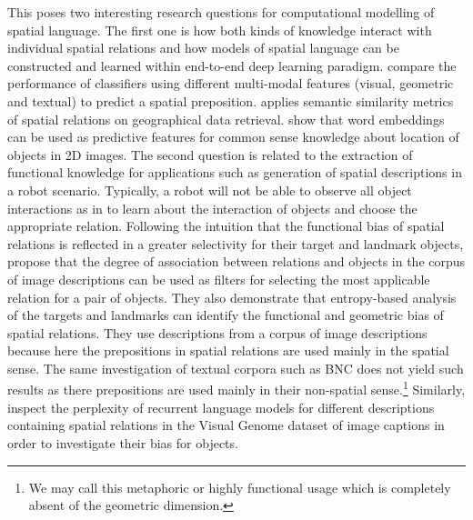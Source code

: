 This poses two interesting research questions for computational modelling of
spatial language. The first one is %
how both kinds of
knowledge interact with individual spatial relations and how models of spatial
language can be constructed and learned within end-to-end deep learning
paradigm. \citet{ramisa2015combining} compare the performance of classifiers
using different multi-modal features (visual, geometric and textual) to predict
a spatial preposition.  \citet{Schwering:2007aa} applies semantic similarity
metrics of spatial relations on geographical data retrieval.
\citet{collell2018acquiring} show that word embeddings can be used as
predictive features for common sense knowledge about location of objects in 2D
images. The second question is related to the extraction of functional
knowledge for applications such as generation of spatial descriptions in a
robot scenario. Typically, a robot will not be able to observe all object
interactions as in \citep{coventry2004spatial} to learn about the interaction of
objects and choose the appropriate relation.
Following the intuition that the functional bias of spatial relations is reflected in a greater selectivity for their target and landmark objects, \citet{Dobnik:2013aa,Dobnik:2014ab} propose that the degree of association
between relations and objects in the corpus of image descriptions can be used as filters for
selecting the most applicable relation for a pair of objects. They also demonstrate that entropy-based
analysis of the targets and landmarks can identify the functional and geometric
bias of spatial relations. They use descriptions from a corpus of image descriptions because here the prepositions in spatial relations are used mainly in the spatial sense. The same investigation of textual corpora such as BNC
\cite{bnc2007british} does not yield such results as there prepositions are used mainly in their non-spatial sense.\footnote{We may call this metaphoric or highly functional usage which is completely absent of the geometric dimension.}
Similarly, \citet{dobnik-etal-2018-exploring} inspect the perplexity of
recurrent language models for different descriptions containing spatial relations %
in the Visual Genome dataset of image captions \cite{krishna2017visual} in order to investigate their bias for objects.

